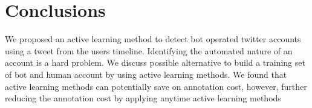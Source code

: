  
\section{Conclusions}

We proposed an active learning method to detect bot operated twitter accounts using a tweet from the users timeline. Identifying the automated nature of an account is a hard problem. We discuss possible alternative to build a training set of bot and human account by using active learning methods. We found that active learning methods can potentially save on annotation cost, however, further reducing the annotation cost by applying anytime active learning methods 
